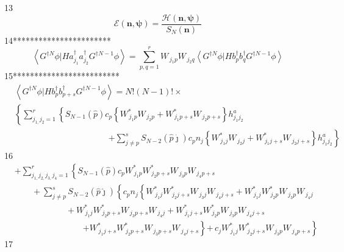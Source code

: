 \documentclass[aps,preprint]{revtex4}%
\begin{document}
13%
\[
\mathcal{E}\left(  \mathbf{n,\psi}\right)  =\frac{\mathcal{H}\left(
\mathbf{n,\psi}\right)  }{S_{N}\left(  \mathbf{n}\right)  }%
\]
14***********************%
\[
\left\langle G^{\dagger N}\phi|Ha_{j_{1}}^{\dagger}a_{j_{2}}^{\dagger
}G^{\dagger N-1}\phi\right\rangle =\sum_{p,q=1}^{r}W_{\,j_{1}p}W_{\,j_{2}%
q}\left\langle G^{\dagger N}\phi|Hb_{p}^{\dagger}b_{q}^{\dagger}G^{\dagger
N-1}\phi\right\rangle
\]
15*************************%
\begin{align*}
&  \left\langle G^{\dagger N}\phi|Hb_{p}^{\dagger}b_{p+s}^{\dagger}G^{\dagger
N-1}\phi\right\rangle =N!\left(  N-1\right)  !\times\\
&  \left\{  \sum_{j_{1,}j_{2}=1}^{r}\left\{  \underset{}{\overset{}{}}%
S_{N-1}\left(  \hat{p}\right)  c_{p}\left\{  W_{\,j_{1}p}^{\ast}W_{\,j_{2}%
p}+W_{\,j_{1}p+s}^{\ast}W_{\,j_{2}p+s}\right\}  h_{j_{1}j_{2}}^{a}\right.
\right.  \\
&  \qquad\qquad\qquad\qquad\qquad\quad\left.  +\right.  \left.  \sum_{j\neq
p}^{s}S_{N-2}\left(  \hat{p}\hat{\jmath}\right)  c_{p}n_{j}\left\{
W_{\,j_{1}j}^{\ast}W_{\,j_{2}j}+W_{\,j_{1}j+s}^{\ast}W_{\,j_{2}j+s}\right\}
h_{j_{1}j_{2}}^{a}\right\}
\end{align*}
16%
\begin{align*}
&  \left.  +\right.  \sum_{j_{1,}j_{2,}j_{3,}j_{4}=1}^{r}\left\{  \underset
{}{\overset{}{\left.  {}\right.  }}S_{N-1}\left(  \hat{p}\right)
c_{p}W_{\,j_{1}p}^{\ast}W_{\,j_{2}p+s}^{\ast}W_{\,j_{3}p}W_{\,j_{4}%
p+s}\right.  \\
&  \qquad+\sum_{j\neq p}^{s}S_{N-2}\left(  \hat{p}\hat{\jmath}\right)
\left\{  c_{p}n_{j}\left\{  W_{\,j_{1}j}^{\ast}W_{\,j_{2}j+s}^{\ast}%
W_{\,j_{3}j}W_{\,j_{4}j+s}+W_{\,j_{1}j}^{\ast}W_{\,j_{2}p}^{\ast}W_{\,j_{3}%
p}W_{\,j_{4}j}\right.  \right.  \\
&  \qquad\qquad\qquad+W_{\,j_{1}j}^{\ast}W_{\,j_{2}p+s}^{\ast}W_{\,j_{3}%
p+s}W_{\,j_{4}j}+W_{\,j_{1}j+s}^{\ast}W_{\,j_{2}p}^{\ast}W_{\,j_{3}%
p}W_{\,j_{4}j+s}\\
&  \qquad\qquad\qquad\qquad\left.  +W_{\,j_{1}j+s}^{\ast}W_{\,j_{2}p+s}^{\ast
}W_{\,j_{3}p+s}W_{\,j_{4}j+s}\right\}  \left.  +\,c_{j}W_{\,j_{1}j}^{\ast
}W_{\,j_{2}j+s}^{\ast}W_{\,j_{3}p}W_{\,j_{4}p+s}\underset{}{\overset{}{}%
}\right\}
\end{align*}
17%
\end{document}
